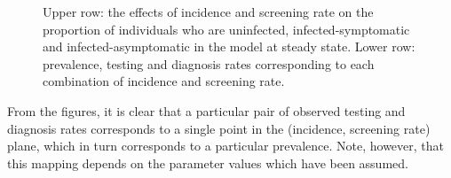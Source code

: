 \documentclass{article}
\begin{document}
    \begin{figure}
        \begin{center}\end{center}
        \caption{Upper row: the effects of incidence and screening rate on the proportion of individuals who are uninfected, infected-symptomatic and infected-asymptomatic in the model at steady state. Lower row: prevalence, testing and diagnosis rates corresponding to each combination of incidence and screening rate.}
        \label{fig:model}
    \end{figure}
    
    From the figures, it is clear that a particular pair of observed testing
and diagnosis rates corresponds to a single point in the (incidence,
screening rate) plane, which in turn corresponds to a particular
prevalence. Note, however, that this mapping depends on the parameter
values which have been assumed.


    
    
    
    
\end{document}
